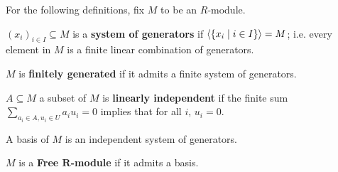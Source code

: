 \documentclass{article}
\begin{document}
For the following definitions, fix $M$ to be an $R$-module.
\begin{definition}
    $(x_i)_{i\in I} \subseteq M$ is a \textbf{system of generators} if $\left\langle \{x_i \mid i\in I \} \right\rangle = M$; i.e. every element in $M$ is a finite linear combination of generators.
\end{definition}

\begin{definition}
    $M$ is \textbf{finitely generated} if it admits a finite system of generators.
\end{definition}

\begin{definition}
    $A\subseteq M$ a subset of $M$ is \textbf{linearly independent} if the finite sum $\sum\limits_{a_i\in A, u_i\in U} a_i u_i = 0$ implies that for all $i$, $u_i = 0$.
\end{definition}

\begin{definition}[Basis]
    A basis of $M$ is an independent system of generators.
\end{definition}

\begin{definition}
    $M$ is a \textbf{Free $\bm{R}$-module} if it admits a basis.
\end{definition}
\end{document}
